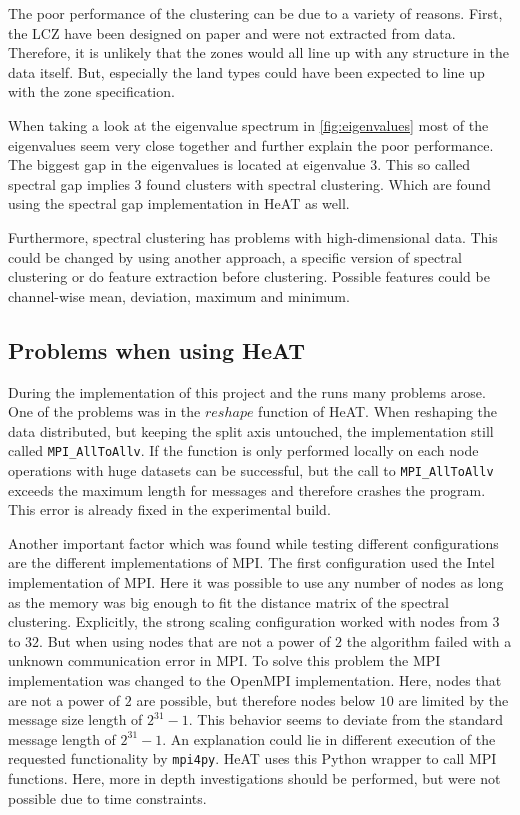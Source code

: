 The poor performance of the clustering can be due to a variety of reasons.
First, the \gls{LCZ} have been designed on paper and were not extracted from data. Therefore, it is unlikely that
the zones would all line up with any structure in the data itself.
But, especially the land types could have been expected to line up with the zone specification.

When taking a look at the eigenvalue spectrum in \cref{fig:eigenvalues} most of the eigenvalues seem very close together and
further explain the poor performance. The biggest gap in the eigenvalues is located at eigenvalue 3. This so called spectral gap
implies 3 found clusters with spectral clustering. Which are found using the spectral gap implementation in \gls{HeAT} as well.

Furthermore, spectral clustering has problems with high-dimensional data. This could be changed by using another approach, a specific version of spectral clustering
or do feature extraction before clustering. Possible features could be channel-wise mean, deviation, maximum and minimum.

\subsection{Problems when using HeAT}
\label{subsec:problems_when_using_heat}
During the implementation of this project and the runs many problems arose.
One of the problems was in the \(reshape\) function of \gls{HeAT}.
When reshaping the data distributed, but keeping the split axis untouched, the implementation still called \lstinline{MPI_AllToAllv}.
If the function is only performed locally on each node operations with huge datasets can be successful, but the call to \lstinline{MPI_AllToAllv} exceeds the maximum length
for messages and therefore crashes the program.
This error is already fixed in the experimental build.

Another important factor which was found while testing different configurations are the different implementations of \gls{MPI}.
The first configuration used the Intel implementation of \gls{MPI}. Here it was possible to use any number of nodes as long as
the memory was big enough to fit the distance matrix of the spectral clustering. Explicitly, the strong scaling configuration worked
with nodes from \(3\) to \(32\).
But when using nodes that are not a power of \(2\) the algorithm failed with a unknown communication error in \gls{MPI}.
To solve this problem the \gls{MPI} implementation was changed to the OpenMPI implementation.
Here, nodes that are not a power of \(2\) are possible, but therefore nodes below \(10\) are limited by the message size length of \(2^{31} - 1\).
This behavior seems to deviate from the standard message length of \(2^{31} - 1\).
An explanation could lie in different execution of the requested functionality by \lstinline{mpi4py}.
\gls{HeAT} uses this Python wrapper to call \gls{MPI} functions.
Here, more in depth investigations should be performed, but were not possible due to time constraints.
